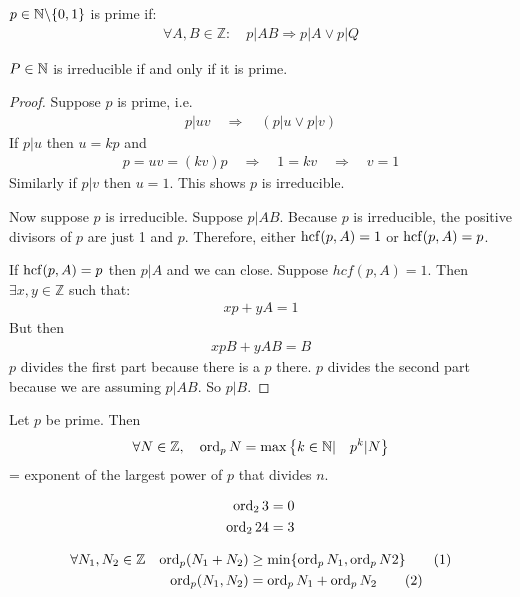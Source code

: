 \begin{df}
$p \in \mathbb N \backslash \{0,1\}$ is prime if:
\begin{align*}
\forall A,B \in \mathbb Z: \quad p|AB \Rightarrow p|A \vee p|Q
\end{align*}
\end{df}
\begin{tm}
$P \in \mathbb N$ is irreducible if and only if it is prime.
\end{tm}
\begin{proof}
Suppose $p$ is prime, i.e.
\begin{align*}
p | uv \quad \Rightarrow \quad (p|u \vee p|v)
\end{align*}
If $p|u$ then $u= kp$ and 
\begin{align*}
p= uv = (kv) p \quad \Rightarrow \quad 1 = kv \quad \Rightarrow \quad v =1
\end{align*}
Similarly if $p|v$ then $u=1$. This shows $p$ is irreducible.


Now suppose $p$ is irreducible. Suppose $p|AB$. Because $p$ is irreducible, the positive divisors of $p$ are just 1 and $p$. Therefore, either $\operatorname{hcf}(p,A)=1$ or $\operatorname{hcf}(p,A)=p$.

If $\operatorname{hcf}(p,A)=p$ then $p|A$ and we can close.
Suppose $hcf(p,A)=1$. 
Then $\exists x,y \in \mathbb Z$ such that:
\begin{align*}
xp + yA =1
\end{align*}
But then 
\begin{align*}
xpB + yAB =B
\end{align*} $p$ divides the first part because there is a $p$ there. $p$ divides the second part because we are assuming $p|AB$.
So $p|B$.  
\end{proof}


\begin{df}
Let $p$ be prime. Then
\begin{align*}
\forall N \in \mathbb Z, \quad \operatorname{ord}_p N = \max \left\{ k \in \mathbb N |\quad p^k|N \right\}
\end{align*}
= exponent of the largest power of $p$ that divides $n$.
\end{df}

\begin{ex}
\begin{align*}
\operatorname{ord}_2 3 & = 0 \\
\operatorname{ord}_2 24 & = 3
\end{align*}
\end{ex}

\begin{pr}
\begin{align*}
& \forall N_1, N_2 \in \mathbb Z &
\operatorname{ord}_p(N_1+N_2) & \ge \min \{ \operatorname{ord}_p N_1, \operatorname{ord}_p N2 \} \tag{1}\\
& & \operatorname{ord}_p(N_1,N_2) & = \operatorname{ord}_p N_1 + \operatorname{ord}_p N_2 \tag{2}
\end{align*}
\end{pr}


